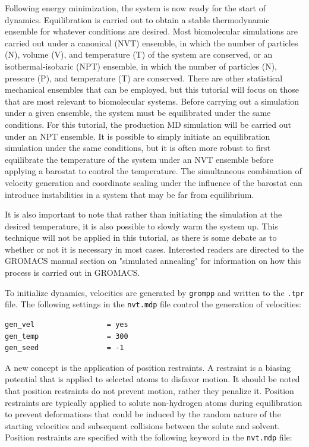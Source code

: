 \documentclass[9pt,tutorial]{livecoms}
\begin{document}
Following energy minimization, the system is now ready for the start of dynamics. Equilibration is carried out to obtain a stable thermodynamic ensemble for whatever conditions are desired. Most biomolecular simulations are carried out under a canonical (NVT) ensemble, in which the number of particles (N), volume (V), and temperature (T) of the system are conserved, or an isothermal-isobaric (NPT) ensemble, in which the number of particles (N), pressure (P), and temperature (T) are conserved. There are other statistical mechanical ensembles that can be employed, but this tutorial will focus on those that are most relevant to biomolecular systems. Before carrying out a simulation under a given ensemble, the system must be equilibrated under the same conditions. For this tutorial, the production MD simulation will be carried out under an NPT ensemble. It is possible to simply initiate an equilibration simulation under the same conditions, but it is often more robust to first equilibrate the temperature of the system under an NVT ensemble before applying a barostat to control the temperature. The simultaneous combination of velocity generation and coordinate scaling under the influence of the barostat can introduce instabilities in a system that may be far from equilibrium.

It is also important to note that rather than initiating the simulation at the desired temperature, it is also possible to slowly warm the system up. This technique will not be applied in this tutorial, as there is some debate as to whether or not it is necessary in most cases. Interested readers are directed to the GROMACS manual section on "simulated annealing" for information on how this process is carried out in GROMACS.

To initialize dynamics, velocities are generated by \texttt{grompp} and written to the \texttt{.tpr} file. The following settings in the \texttt{nvt.mdp} file control the generation of velocities:

\begin{verbatim}
gen_vel                 = yes
gen_temp                = 300
gen_seed                = -1
\end{verbatim}

A new concept is the application of position restraints. A restraint is a biasing potential that is applied to selected atoms to disfavor motion. It should be noted that position restraints do not prevent motion, rather they penalize it. Position restraints are typically applied to solute non-hydrogen atoms during equilibration to prevent deformations that could be induced by the random nature of the starting velocities and subsequent collisions between the solute and solvent. Position restraints are specified with the following keyword in the \texttt{nvt.mdp} file:
\end{document}
